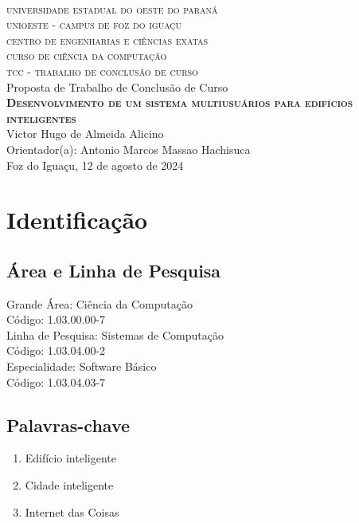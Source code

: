 \documentclass[
	12pt,				%
	a4paper,			%
	english,			%
	brazil,				%
	]{article}
\begin{document}
\begin{center}

	\textsc{
		\large
			\\universidade estadual do oeste do paraná
			\\unioeste - campus de foz do iguaçu
			\\centro de engenharias e ciências exatas
			\\curso de ciência da computação
			\\[1 cm]tcc - trabalho de conclusão de curso
	}
	\\
	[4 cm]
	\large Proposta de Trabalho de Conclusão de Curso
    \\
	\textbf{
	    \textsc{Desenvolvimento de um sistema multiusuários para edifícios inteligentes}
    }
	\\[5 cm]Victor Hugo de Almeida Alicino
    \\Orientador(a): Antonio Marcos Massao Hachisuca
    \\[2 cm]Foz do Iguaçu, 12 de agosto de 2024
    
\end{center}

\thispagestyle{empty}

\section{Identificação}
    
    \subsection{Área e Linha de Pesquisa} 
        \noindent Grande Área: Ciência da Computação
        \\Código: 1.03.00.00-7
    	\\[1 cm]Linha de Pesquisa: Sistemas de Computação  
    	\\Código: 1.03.04.00-2
    	\\[1 cm]Especialidade: Software Básico
    	\\Código: 1.03.04.03-7
    	
    	
    \subsection{Palavras-chave}

        \begin{enumerate}
        	\item Edifício inteligente
        	\item Cidade inteligente
        	\item Internet das Coisas
        \end{enumerate}
\end{document}
